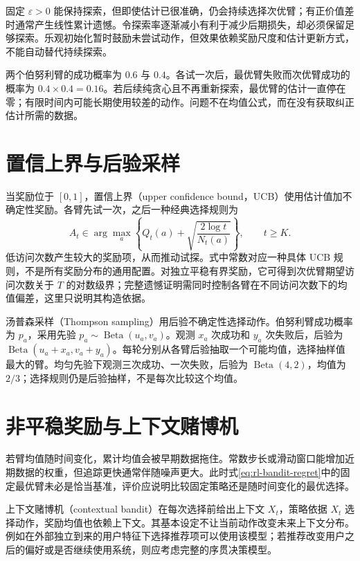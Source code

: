 固定 $\varepsilon>0$ 能保持探索，但即使估计已很准确，仍会持续选择次优臂；有正价值差时通常产生线性累计遗憾。令探索率逐渐减小有利于减少后期损失，却必须保留足够探索。乐观初始化暂时鼓励未尝试动作，但效果依赖奖励尺度和估计更新方式，不能自动替代持续探索。

\begin{example}[初期噪声锁定错误动作]
两个伯努利臂的成功概率为 $0.6$ 与 $0.4$。各试一次后，最优臂失败而次优臂成功的概率为 $0.4\times0.4=0.16$。若后续纯贪心且不再重新探索，最优臂的估计一直停在零；有限时间内可能长期使用较差的动作。问题不在均值公式，而在没有获取纠正估计所需的数据。
\end{example}

\section{置信上界与后验采样}

当奖励位于 $[0,1]$，置信上界（upper confidence bound，UCB）使用估计值加不确定性奖励。各臂先试一次，之后一种经典选择规则为
\[
A_t\in\arg\max_a\left\{Q_t(a)+\sqrt{\frac{2\log t}{N_t(a)}}\right\},\qquad t\geq K.
\]
低访问次数产生较大的奖励项，从而推动试探。式中常数对应一种具体 UCB 规则，不是所有奖励分布的通用配置。对独立平稳有界奖励，它可得到次优臂期望访问次数关于 $T$ 的对数级界\cite{sutton-barto}；完整遗憾证明需同时控制各臂在不同访问次数下的均值偏差，这里只说明其构造依据。

汤普森采样（Thompson sampling）用后验不确定性选择动作。伯努利臂成功概率为 $p_a$，采用先验 $p_a\sim\operatorname{Beta}(u_a,v_a)$。观测 $x_a$ 次成功和 $y_a$ 次失败后，后验为 $\operatorname{Beta}(u_a+x_a,v_a+y_a)$。每轮分别从各臂后验抽取一个可能均值，选择抽样值最大的臂。均匀先验下观测三次成功、一次失败，后验为 $\operatorname{Beta}(4,2)$，均值为 $2/3$；选择规则仍是后验抽样，不是每次比较这个均值。

\section{非平稳奖励与上下文赌博机}

若臂均值随时间变化，累计均值会被早期数据拖住。常数步长或滑动窗口能增加近期数据的权重，但追踪更快通常伴随噪声更大。此时式\eqref{eq:rl-bandit-regret}中的固定最优臂未必是恰当基准，评价应说明比较固定策略还是随时间变化的最优选择。

上下文赌博机（contextual bandit）在每次选择前给出上下文 $X_t$，策略依据 $X_t$ 选择动作，奖励均值也依赖上下文。其基本设定不让当前动作改变未来上下文分布。例如在外部独立到来的用户特征下选择推荐项可以使用该模型；若推荐改变用户之后的偏好或是否继续使用系统，则应考虑完整的序贯决策模型。

